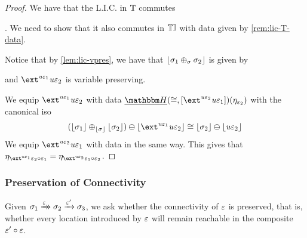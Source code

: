 \begin{proof}
    We have that the L.I.C. in $\mathbb{T}$ commutes
    .
    We need to show that it also commutes in ${\mathbb{T}\mathbb{I}}$ with data given by \cref{rem:lic-T-data}.

    Notice that by \cref{lem:lic-vpres}, we have that $\lfloor\sigma_1 \oplus_{\sigma} \sigma_2\rfloor$ is given by
    \begin{center}
    \end{center}
    and $\ext^{\tinstU\me_1}\tinstU\me_2$ is variable preserving.

    We equip $\ext^{\tinstU\me_1}\tinstU\me_2$ with data $\dheapF(\iso, \anyL{\ext^{\tinstU\me_2}\tinstU\me_1})(\mvarM_{\me_2})$ with the canonical iso
    \[ (\concL{\sigma_1} \liplus{\concL\sigma} \concL{\sigma_2}) \ominus \concL{\ext^{\tinstU\me_1}\tinstU\me_2} \iso \concL{\sigma_2} \ominus \concL{\tinstU\me_2} \]
    We equip $\ext^{\tinstU\me_2}\tinstU\me_1$ with data in the same way.
    This gives that $\mvarM_{\ext^{\tinstU\me_1}\me_2 \comp \me_1} = \mvarM_{\ext^{\tinstU\me_2}\me_1 \comp \me_2}$.
\end{proof}

\subsubsection{Preservation of Connectivity}

Given $\sigma_1 \xrightarrow[]{\varepsilon}\mathrel{\mkern-14mu}\rightarrow \sigma_2 \xrightarrow{\varepsilon'} \sigma_3$, we ask whether the connectivity of $\varepsilon$ is preserved,
that is, whether every location introduced by $\varepsilon$ will remain reachable in the composite $\varepsilon' \circ \varepsilon$.

